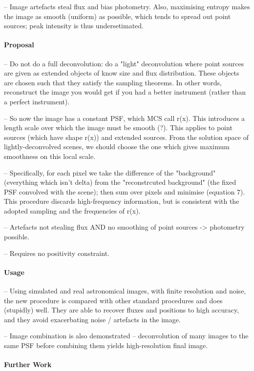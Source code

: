 \documentclass[letterpaper, 11pt]{article}
\begin{document}
-- Image artefacts steal flux and bias photometry. Also, maximising entropy makes the image as 
smooth (uniform) as possible, which tends to spread out point sources; peak intensity is thus undersetimated.


\paragraph{Proposal}

-- Do not do a full deconvolution: do a "light" deconvolution where point sources are given as extended objects of know size and flux 
distribution. These objects are chosen such that they satisfy the sampling theorems. In other words, reconstruct the image you would get if 
you had a better instrument (rather than a perfect instrument).

-- So now the image has a constant PSF, which MCS call r(x). This introduces a length scale over which the image must be smooth (?). This 
applies to point sources (which have shape r(x)) and extended sources. From the solution space of lightly-deconvolved scenes, we should 
choose the one which gives maximum smoothness on this local scale.

-- Specifically, for each pixel we take the difference of the "background" (everything which isn't delta) from the "reconstrcuted background" 
(the fixed PSF convolved with the scene); then sum over pixels and minimise (equation 7). This procedure discards high-frequency information, 
but is consistent with the adopted sampling and the frequencies of r(x).

-- Artefacts not stealing flux AND no smoothing of point sources -> 
photometry possible.

-- Requires no positivity constraint.


\paragraph{Usage}

-- Using simulated and real astronomical images, with finite resolution and noise, the new procedure is compared with other standard 
procedures and does (stupidly) well. They are able to recover fluxes and positions to high accuracy, and they avoid exacerbating noise / 
artefacts in the image.

-- Image combination is also demonstrated -- deconvolution of many images to the same PSF before combining them yields 
high-resolution final image.


\paragraph{Further Work}
\end{document}
